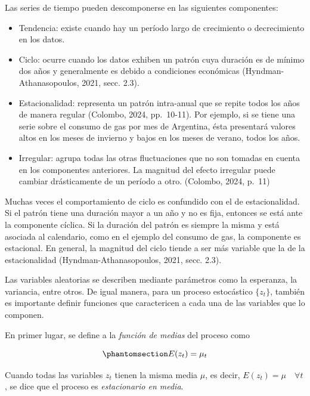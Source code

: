 \documentclass[12pt]{article}
\providecommand{\tightlist}{%
  \setlength{\itemsep}{0pt}\setlength{\parskip}{0pt}}\usepackage{longtable,booktabs,array}
\begin{document}
Las series de tiempo pueden descomponerse en las siguientes componentes:

\begin{itemize}
\tightlist
\item
  Tendencia: existe cuando hay un período largo de crecimiento o
  decrecimiento en los datos.
\item
  Ciclo: ocurre cuando los datos exhiben un patrón cuya duración es de
  mínimo dos años y generalmente es debido a condiciones económicas
  (Hyndman-Athanasopoulos, 2021, secc. 2.3).
\item
  Estacionalidad: representa un patrón intra-anual que se repite todos
  los años de manera regular (Colombo, 2024, pp.~10-11). Por ejemplo, si
  se tiene una serie sobre el consumo de gas por mes de Argentina, ésta
  presentará valores altos en los meses de invierno y bajos en los meses
  de verano, todos los años.
\item
  Irregular: agrupa todas las otras fluctuaciones que no son tomadas en
  cuenta en los componentes anteriores. La magnitud del efecto irregular
  puede cambiar drásticamente de un período a otro. (Colombo, 2024,
  p.~11)
\end{itemize}

Muchas veces el comportamiento de ciclo es confundido con el de
estacionalidad. Si el patrón tiene una duración mayor a un año y no es
fija, entonces se está ante la componente cíclica. Si la duración del
patrón es siempre la misma y está asociada al calendario, como en el
ejemplo del consumo de gas, la componente es estacional. En general, la
magnitud del ciclo tiende a ser más variable que la de la estacionalidad
(Hyndman-Athanasopoulos, 2021, secc. 2.3).

Las variables aleatorias se describen mediante parámetros como la
esperanza, la variancia, entre otros. De igual manera, para un proceso
estocástico \(\{z_t\}\), también es importante definir funciones que
caractericen a cada una de las variables que lo componen.

En primer lugar, se define a la \emph{función de medias} del proceso
como

\begin{equation}\phantomsection\label{eq-fc_de_medias}{
E(z_t) = \mu_t
}\end{equation}

Cuando todas las variables \(z_t\) tienen la misma media \(\mu\), es
decir, \(E(z_t) = \mu \quad \forall t\), se dice que el proceso es
\emph{estacionario en media}.
\end{document}
